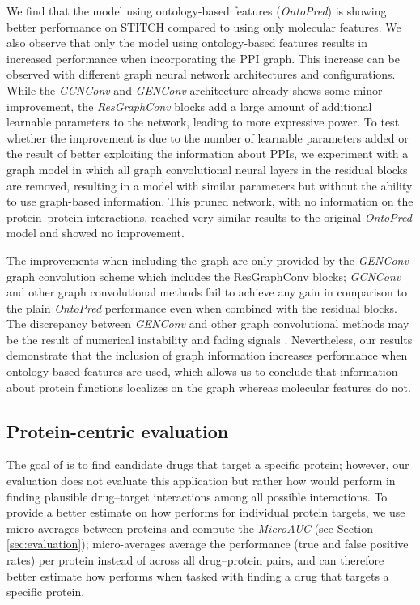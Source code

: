 \documentclass{bioinfo}
\renewcommand{\cite}{\citep}
\begin{document}
We find that the model using ontology-based features
(\textit{OntoPred}) is showing better performance on STITCH compared
to using only molecular features. We also observe that only the model
using ontology-based features results in increased performance when
incorporating the PPI graph. This increase can be observed with
different graph neural network architectures and configurations. While
the {\em GCNConv} and {\em GENConv} architecture already shows some
minor improvement, the \textit{ResGraphConv} blocks add a large amount
of additional learnable parameters to the network, leading to more
expressive power. To test whether the improvement is due to the number
of learnable parameters added or the result of better exploiting the
information about PPIs, we experiment with a graph model in which all
graph convolutional neural layers in the residual blocks are removed,
resulting in a model with similar parameters but without the ability
to use graph-based information. This pruned network, with no
information on the protein--protein interactions, reached very similar
results to the original \textit{OntoPred} model and showed no
improvement.

The improvements when including the graph are only provided by the
\textit{GENConv} graph convolution scheme which includes the
ResGraphConv blocks; \textit{GCNConv} and other graph
convolutional methods fail to achieve any gain in comparison to the
plain \textit{OntoPred} performance even when combined with the
residual blocks. The discrepancy between {\em GENConv} and other graph
convolutional methods may be the result of numerical instability and
fading signals \cite{}.
Nevertheless, our results demonstrate that the inclusion of graph
information increases performance when ontology-based features are
used, which allows us to conclude that information about protein
functions localizes on the graph whereas molecular features do not.










\subsection{Protein-centric evaluation}
The goal of \name is to find candidate drugs that target a specific
protein; however, our evaluation does not evaluate this application
but rather how \name would perform in finding plausible drug--target
interactions among all possible interactions. To provide a better
estimate on how \name performs for individual protein targets, we use
micro-averages between proteins and compute the \textit{MicroAUC} (see
Section \ref{sec:evaluation}); micro-averages average the performance
(true and false positive rates) per protein instead of across all
drug--protein pairs, and can therefore better estimate how \name
performs when tasked with finding a drug that targets a specific
protein.
\end{document}
